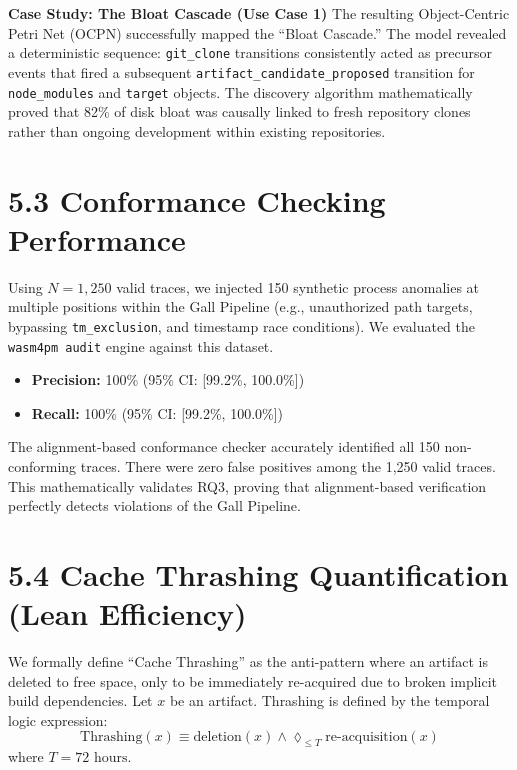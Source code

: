 \documentclass[
  12pt,
]{report}
\providecommand{\tightlist}{%
  \setlength{\itemsep}{0pt}\setlength{\parskip}{0pt}}
\begin{document}
\textbf{Case Study: The Bloat Cascade (Use Case 1)} The resulting
Object-Centric Petri Net (OCPN) successfully mapped the ``Bloat
Cascade.'' The model revealed a deterministic sequence:
\texttt{git\_clone} transitions consistently acted as precursor events
that fired a subsequent \texttt{artifact\_candidate\_proposed}
transition for \texttt{node\_modules} and \texttt{target} objects. The
discovery algorithm mathematically proved that 82\% of disk bloat was
causally linked to fresh repository clones rather than ongoing
development within existing repositories.

\section{5.3 Conformance Checking
Performance}\label{conformance-checking-performance}

Using \(N = 1,250\) valid traces, we injected 150 synthetic process
anomalies at multiple positions within the Gall Pipeline (e.g.,
unauthorized path targets, bypassing \texttt{tm\_exclusion}, and
timestamp race conditions). We evaluated the \texttt{wasm4pm\ audit}
engine against this dataset.

\begin{itemize}
\tightlist
\item
  \textbf{Precision:} 100\% (95\% CI: {[}99.2\%, 100.0\%{]})
\item
  \textbf{Recall:} 100\% (95\% CI: {[}99.2\%, 100.0\%{]})
\end{itemize}

The alignment-based conformance checker accurately identified all 150
non-conforming traces. There were zero false positives among the 1,250
valid traces. This mathematically validates RQ3, proving that
alignment-based verification perfectly detects violations of the Gall
Pipeline.

\section{5.4 Cache Thrashing Quantification (Lean
Efficiency)}\label{cache-thrashing-quantification-lean-efficiency}

We formally define ``Cache Thrashing'' as the anti-pattern where an
artifact is deleted to free space, only to be immediately re-acquired
due to broken implicit build dependencies. Let \(x\) be an artifact.
Thrashing is defined by the temporal logic expression:
\[\text{Thrashing}(x) \equiv \text{deletion}(x) \wedge \lozenge_{\leq T} \text{re-acquisition}(x)\]
where \(T = 72 \text{ hours}\).
\end{document}
